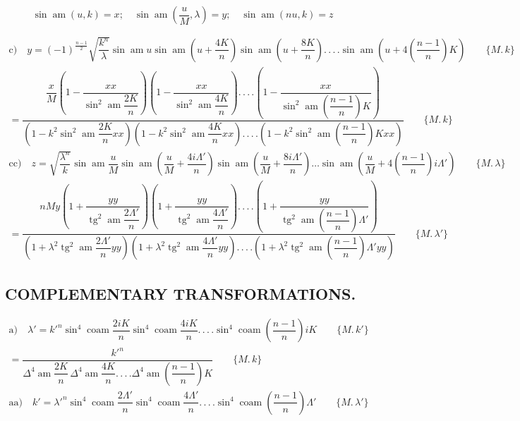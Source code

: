 \documentclass{article}
\begin{document}
\[
\sin\operatorname{am}(u,k)=x;\quad \sin\operatorname{am}\left(\dfrac{u}{M},\lambda\right)=y;\quad \sin\operatorname{am}(nu,k)=z
\]

\[
\begin{gathered}
\text{c)}\quad y=(-1)^{\frac{n-1}{2}}\sqrt{\dfrac{k^{n}}{\lambda}}\sin\operatorname{am}u\sin\operatorname{am}\left(u+\dfrac{4K}{n}\right)\sin\operatorname{am}\left(u+\dfrac{8K}{n}\right).\,.\,.\,.\sin\operatorname{am}\left(u+4\left(\dfrac{n-1}{n}\right)K\right)\qquad\{M.\,k\}\\[1.5ex]
{}=\dfrac{\dfrac{x}{M}\left(1-\dfrac{xx}{\sin^{2}\operatorname{am}\dfrac{2K}{n}}\right)\left(1-\dfrac{xx}{\sin^{2}\operatorname{am}\dfrac{4K}{n}}\right).\,.\,.\,.\left(1-\dfrac{xx}{\sin^{2}\operatorname{am}\left(\dfrac{n-1}{n}\right)K}\right)}{\left(1-k^{2}\sin^{2}\operatorname{am}\dfrac{2K}{n}xx\right)\left(1-k^{2}\sin^{2}\operatorname{am}\dfrac{4K}{n}xx\right).\,.\,.\,.\left(1-k^{2}\sin^{2}\operatorname{am}\left(\dfrac{n-1}{n}\right)Kxx\right)}\qquad\{M.\,k\}\\[1.5ex]
\text{cc)}\quad z=\sqrt{\dfrac{\lambda^{n}}{k}}\sin\operatorname{am}\dfrac{u}{M}\sin\operatorname{am}\left(\dfrac{u}{M}+\dfrac{4i\Lambda'}{n}\right)\sin\operatorname{am}\left(\dfrac{u}{M}+\dfrac{8i\Lambda'}{n}\right)\ldots\sin\operatorname{am}\left(\dfrac{u}{M}+4\left(\dfrac{n-1}{n}\right)i\Lambda'\right)\qquad\{M.\,\lambda\}\\[1.5ex]
{}=\dfrac{nMy\left(1+\dfrac{yy}{\operatorname{tg}^{2}\operatorname{am}\dfrac{2\Lambda'}{n}}\right)\left(1+\dfrac{yy}{\operatorname{tg}^{2}\operatorname{am}\dfrac{4\Lambda'}{n}}\right).\,.\,.\,.\left(1+\dfrac{yy}{\operatorname{tg}^{2}\operatorname{am}\left(\dfrac{n-1}{n}\right)\Lambda'}\right)}{\left(1+\lambda^{2}\operatorname{tg}^{2}\operatorname{am}\dfrac{2\Lambda'}{n}yy\right)\left(1+\lambda^{2}\operatorname{tg}^{2}\operatorname{am}\dfrac{4\Lambda'}{n}yy\right).\,.\,.\,.\left(1+\lambda^{2}\operatorname{tg}^{2}\operatorname{am}\left(\dfrac{n-1}{n}\right)\Lambda'yy\right)}\qquad\{M.\,\lambda'\}
\end{gathered}
\]

\subsection*{COMPLEMENTARY TRANSFORMATIONS.}

\[
\begin{gathered}
\text{a)}\quad \lambda'=k'^{n}\sin^{4}\operatorname{coam}\dfrac{2iK}{n}\sin^{4}\operatorname{coam}\dfrac{4iK}{n}.\,.\,.\,.\sin^{4}\operatorname{coam}\left(\dfrac{n-1}{n}\right)iK\qquad\{M.\,k'\}\\[1.5ex]
{}=\dfrac{k'^{n}}{\Delta^{4}\operatorname{am}\dfrac{2K}{n}\,\Delta^{4}\operatorname{am}\dfrac{4K}{n}.\,.\,.\,.\Delta^{4}\operatorname{am}\left(\dfrac{n-1}{n}\right)K}\qquad\{M.\,k\}\\[1.5ex]
\text{aa)}\quad k'=\lambda'^{n}\sin^{4}\operatorname{coam}\dfrac{2\Lambda'}{n}\sin^{4}\operatorname{coam}\dfrac{4\Lambda'}{n}.\,.\,.\,.\sin^{4}\operatorname{coam}\left(\dfrac{n-1}{n}\right)\Lambda'\qquad\{M.\,\lambda'\}
\end{gathered}
\]
\end{document}
